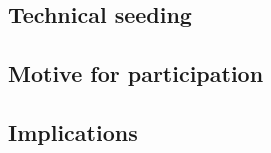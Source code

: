 
\subsection{Technical seeding}


\subsection{Motive for participation}


\subsection{Implications}

